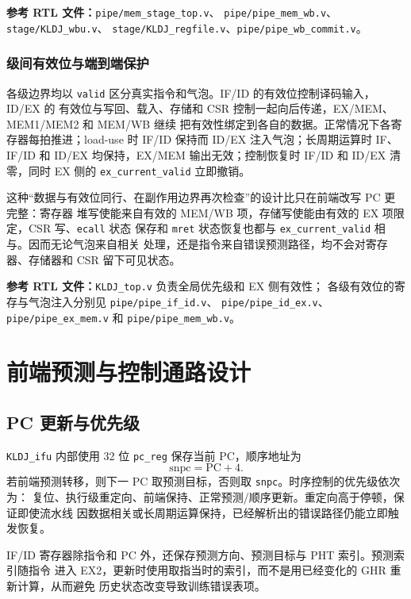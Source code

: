 \documentclass[UTF8,zihao=-4,a4paper]{ctexart}
\numberwithin{table}{section}
\numberwithin{figure}{section}
\newcommand{\code}[1]{\texttt{#1}}
\begin{document}
\noindent\textbf{参考 RTL 文件：}\code{pipe/mem\_stage\_top.v}、
\code{pipe/pipe\_mem\_wb.v}、\code{stage/KLDJ\_wbu.v}、
\code{stage/KLDJ\_regfile.v}、\code{pipe/pipe\_wb\_commit.v}。

\subsubsection{级间有效位与端到端保护}

各级边界均以 \code{valid} 区分真实指令和气泡。IF/ID 的有效位控制译码输入，ID/EX 的
有效位与写回、载入、存储和 CSR 控制一起向后传递，EX/MEM、MEM1/MEM2 和 MEM/WB 继续
把有效性绑定到各自的数据。正常情况下各寄存器每拍推进；load-use 时 IF/ID 保持而 ID/EX
注入气泡；长周期运算时 IF、IF/ID 和 ID/EX 均保持，EX/MEM 输出无效；控制恢复时 IF/ID
和 ID/EX 清零，同时 EX 侧的 \code{ex\_current\_valid} 立即撤销。

这种“数据与有效位同行、在副作用边界再次检查”的设计比只在前端改写 PC 更完整：寄存器
堆写使能来自有效的 MEM/WB 项，存储写使能由有效的 EX 项限定，CSR 写、\code{ecall} 状态
保存和 \code{mret} 状态恢复也都与 \code{ex\_current\_valid} 相与。因而无论气泡来自相关
处理，还是指令来自错误预测路径，均不会对寄存器、存储器和 CSR 留下可见状态。

\noindent\textbf{参考 RTL 文件：}\code{KLDJ\_top.v} 负责全局优先级和 EX 侧有效性；
各级有效位的寄存与气泡注入分别见 \code{pipe/pipe\_if\_id.v}、
\code{pipe/pipe\_id\_ex.v}、\code{pipe/pipe\_ex\_mem.v} 和
\code{pipe/pipe\_mem\_wb.v}。

\section{前端预测与控制通路设计}

\subsection{PC 更新与优先级}

\code{KLDJ\_ifu} 内部使用 32 位 \code{pc\_reg} 保存当前 PC，顺序地址为
\begin{equation}
  \mathrm{snpc}=\mathrm{PC}+4.
\end{equation}
若前端预测转移，则下一 PC 取预测目标，否则取 \code{snpc}。时序控制的优先级依次为：
复位、执行级重定向、前端保持、正常预测/顺序更新。重定向高于停顿，保证即使流水线
因数据相关或长周期运算保持，已经解析出的错误路径仍能立即触发恢复。

IF/ID 寄存器除指令和 PC 外，还保存预测方向、预测目标与 PHT 索引。预测索引随指令
进入 EX2，更新时使用取指当时的索引，而不是用已经变化的 GHR 重新计算，从而避免
历史状态改变导致训练错误表项。
\end{document}
